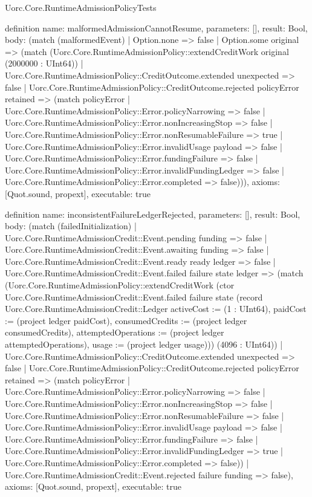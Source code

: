 \begin{lexlean}{Uorc.Core.RuntimeAdmissionPolicyTests}
\begin{semanticmodule}
definition{
  name: malformedAdmissionCannotResume,
  parameters: [],
  result: Bool,
  body: (match (malformedEvent)
    | Option.none => false
    | Option.some original => (match (Uorc.Core.RuntimeAdmissionPolicy::extendCreditWork original (2000000 : UInt64))
      | Uorc.Core.RuntimeAdmissionPolicy::CreditOutcome.extended unexpected => false
      | Uorc.Core.RuntimeAdmissionPolicy::CreditOutcome.rejected policyError retained => (match policyError
        | Uorc.Core.RuntimeAdmissionPolicy::Error.policyNarrowing => false
        | Uorc.Core.RuntimeAdmissionPolicy::Error.nonIncreasingStop => false
        | Uorc.Core.RuntimeAdmissionPolicy::Error.nonResumableFailure => true
        | Uorc.Core.RuntimeAdmissionPolicy::Error.invalidUsage payload => false
        | Uorc.Core.RuntimeAdmissionPolicy::Error.fundingFailure => false
        | Uorc.Core.RuntimeAdmissionPolicy::Error.invalidFundingLedger => false
        | Uorc.Core.RuntimeAdmissionPolicy::Error.completed => false))),
  axioms: [Quot.sound, propext],
  executable: true
}

definition{
  name: inconsistentFailureLedgerRejected,
  parameters: [],
  result: Bool,
  body: (match (failedInitialization)
    | Uorc.Core.RuntimeAdmissionCredit::Event.pending funding => false
    | Uorc.Core.RuntimeAdmissionCredit::Event.awaiting funding => false
    | Uorc.Core.RuntimeAdmissionCredit::Event.ready ready ledger => false
    | Uorc.Core.RuntimeAdmissionCredit::Event.failed failure state ledger => (match (Uorc.Core.RuntimeAdmissionPolicy::extendCreditWork (ctor Uorc.Core.RuntimeAdmissionCredit::Event.failed failure state (record Uorc.Core.RuntimeAdmissionCredit::Ledger {activeCost := (1 : UInt64), paidCost := (project ledger paidCost), consumedCredits := (project ledger consumedCredits), attemptedOperations := (project ledger attemptedOperations), usage := (project ledger usage)})) (4096 : UInt64))
      | Uorc.Core.RuntimeAdmissionPolicy::CreditOutcome.extended unexpected => false
      | Uorc.Core.RuntimeAdmissionPolicy::CreditOutcome.rejected policyError retained => (match policyError
        | Uorc.Core.RuntimeAdmissionPolicy::Error.policyNarrowing => false
        | Uorc.Core.RuntimeAdmissionPolicy::Error.nonIncreasingStop => false
        | Uorc.Core.RuntimeAdmissionPolicy::Error.nonResumableFailure => false
        | Uorc.Core.RuntimeAdmissionPolicy::Error.invalidUsage payload => false
        | Uorc.Core.RuntimeAdmissionPolicy::Error.fundingFailure => false
        | Uorc.Core.RuntimeAdmissionPolicy::Error.invalidFundingLedger => true
        | Uorc.Core.RuntimeAdmissionPolicy::Error.completed => false))
    | Uorc.Core.RuntimeAdmissionCredit::Event.rejected failure funding => false),
  axioms: [Quot.sound, propext],
  executable: true
}


\end{semanticmodule}
\end{lexlean}
